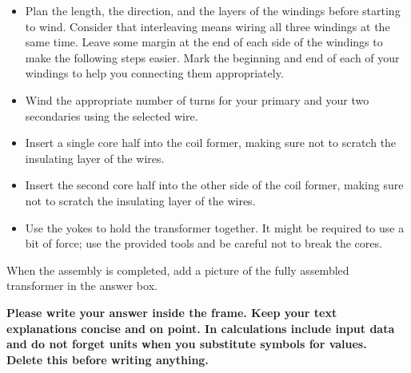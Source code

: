 \documentclass{PELsmallreport}
\begin{document}
\begin{itemize}
     
    \item Plan the length, the direction, and the layers of the windings before starting to wind. Consider that interleaving means wiring all three windings at the same time.
    Leave some margin at the end of each side of the windings to make the following steps easier. 
    Mark the beginning and end of each of your windings to help you connecting them appropriately.
    \item Wind the appropriate number of turns for your primary and your two secondaries using the selected wire. 
    \item Insert a single core half into the coil former, making sure not to scratch the insulating layer of the wires.
    \item Insert the second core half into the other side of the coil former, making sure not to scratch the insulating layer of the wires. 
    \item Use the yokes to hold the transformer together. It might be required to use a bit of force; use the provided tools and be careful not to break the cores. 
\end{itemize}

When the assembly is completed, add a picture of the fully assembled transformer in the answer box.

\begin{framed}
	\vspace{2em}
	\textbf{Please write your answer inside the frame. Keep your text explanations concise and on point. In calculations include input data and do not forget units when you substitute symbols for values. \\ Delete this before writing anything.}
	\vspace{2em}
\end{framed}

\hfill{}
\end{document}
